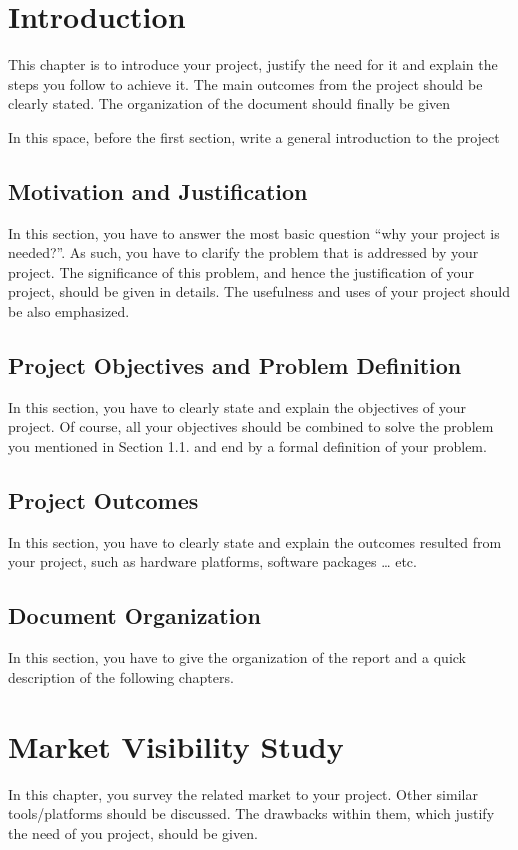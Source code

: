 \chapter{Introduction}
This chapter is to introduce your project, justify the need for it and explain the steps you follow to achieve it. The main outcomes from the project should be clearly stated. The organization of the document should finally be given

In this space, before the first section, write a general introduction to the project

\section{Motivation and Justification}
In this section, you have to answer the most basic question “why your project is needed?”. As such, you have to clarify the problem that is addressed by your project. The significance of this problem, and hence the justification of your project, should be given in details. The usefulness and uses of your project should be also emphasized.

\section{Project Objectives and Problem Definition}
In this section, you have to clearly state and explain the objectives of your project. Of course, all your objectives should be combined to solve the problem you mentioned in Section 1.1. and end by a formal definition of your problem.

\section{Project Outcomes}
In this section, you have to clearly state and explain the outcomes resulted from your project, such as hardware platforms, software packages … etc.

\section{Document Organization}
In this section, you have to give the organization of the report and a quick description of the following chapters.

\chapter{Market Visibility Study}
In this chapter, you survey the related market to your project. Other similar tools/platforms should be discussed. The drawbacks within them, which justify the need of you project, should be given.

